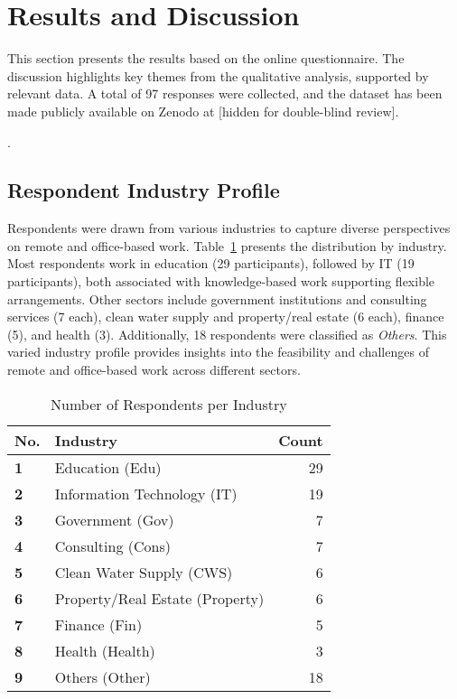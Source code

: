 \documentclass[conference]{IEEEtran}
\begin{document}
\section{Results and Discussion}
\label{sec:results}

This section presents the results based on the online questionnaire. The discussion highlights key themes from the qualitative analysis, supported by relevant data. A total of 97 responses were collected, and the dataset has been made publicly available on Zenodo at [hidden for double-blind review].

.

\subsection{Respondent Industry Profile}
\label{sec:respondent-industry}

Respondents were drawn from various industries to capture diverse perspectives on remote and office-based work. Table~\ref{Respondent Industry} presents the distribution by industry. Most respondents work in education (29 participants), followed by IT (19 participants), both associated with knowledge-based work supporting flexible arrangements. Other sectors include government institutions and consulting services (7 each), clean water supply and property/real estate (6 each), finance (5), and health (3). Additionally, 18 respondents were classified as \textit{Others}. This varied industry profile provides insights into the feasibility and challenges of remote and office-based work across different sectors.


\begin{table}[ht]
	\caption{Number of Respondents per Industry}
	\label{Respondent Industry}
	\begin{tabular}{|p{}|p{}|r|}
		\cline{1-3}
		\textbf{No.} & \textbf{Industry}      & \textbf{Count}   \\ \hline
		\textbf{1}  & Education (Edu)     & 29            \\ \hline
		\textbf{2}  & Information Technology (IT)         & 19 \\ \hline %
		\textbf{3}  & Government (Gov)     & 7             \\ \hline
		\textbf{4}  & Consulting (Cons)     & 7 \\ \hline %
		\textbf{5}  & Clean Water Supply (CWS) & 6          \\   \hline
		\textbf{6}  & Property/Real Estate (Property)     & 6             \\ \hline
		\textbf{7}  & Finance (Fin)     & 5             \\ \hline
		\textbf{8}  & Health (Health)    & 3             \\ \hline
		\textbf{9}  & Others (Other)       & 18 %
		\\ \hline
	\end{tabular}
\end{table}
\end{document}
